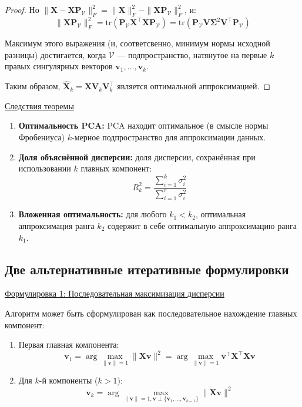 \begin{proof}
    Но $\|\bm{X} - \bm{X}\bm{P}_{\mathcal{V}}\|_F^2 = \|\bm{X}\|_F^2 - \|\bm{X}\bm{P}_{\mathcal{V}}\|_F^2$, и:
    \[ \|\bm{X}\bm{P}_{\mathcal{V}}\|_F^2 = \text{tr}(\bm{P}_{\mathcal{V}}\bm{X}^\top\bm{X}\bm{P}_{\mathcal{V}}) =
    \text{tr}(\bm{P}_{\mathcal{V}}\bm{V}\bm{\Sigma}^2\bm{V}^\top\bm{P}_{\mathcal{V}}) \]
    
    Максимум этого выражения (и, соответсвенно, минимум нормы исходной разницы) достигается, когда
    $\mathcal{V}$ --- подпространство, натянутое на первые $k$ правых сингулярных векторов $\bm{v}_1, \dots, \bm{v}_k$.
    
    Таким образом, $\hat{\bm{X}}_k = \bm{X}\bm{V}_k\bm{V}_k^\top$ является оптимальной аппроксимацией.
\end{proof}

\underline{Следствия теоремы}

\begin{enumerate}
    \item \textbf{Оптимальность PCA:} PCA находит оптимальное (в смысле нормы Фробениуса) $k$-мерное подпространство
    для аппроксимации данных.
    \item \textbf{Доля объяснённой дисперсии:} доля дисперсии, сохранённая при использовании $k$ главных компонент:
    \[ R_k^2 = \frac{\sum_{i=1}^k \sigma_i^2}{\sum_{i=1}^r \sigma_i^2}\]
    \item \textbf{Вложенная оптимальность:} для любого $k_1 < k_2$, оптимальная аппроксимация ранга $k_2$ содержит
    в себе оптимальную аппроксимацию ранга $k_1$.
\end{enumerate}

\subsection{Две альтернативные итеративные формулировки}

\underline{Формулировка 1: Последовательная максимизация дисперсии}

Алгоритм может быть сформулирован как последовательное нахождение главных компонент:

\begin{enumerate}
    \item Первая главная компонента:
    \[ \bm{v}_1 = \arg\max_{\|\bm{v}\|=1} \|\bm{X}\bm{v}\|^2 = \arg\max_{\|\bm{v}\|=1} \bm{v}^\top\bm{X}^\top\bm{X}\bm{v} \]
    
    \item Для $k$-й компоненты ($k > 1$):
    \[ \bm{v}_k = \arg\max_{\|\bm{v}\|=1, \bm{v} \perp \{\bm{v}_1, \dots, \bm{v}_{k-1}\}} \|\bm{X}\bm{v}\|^2 \]
\end{enumerate}

